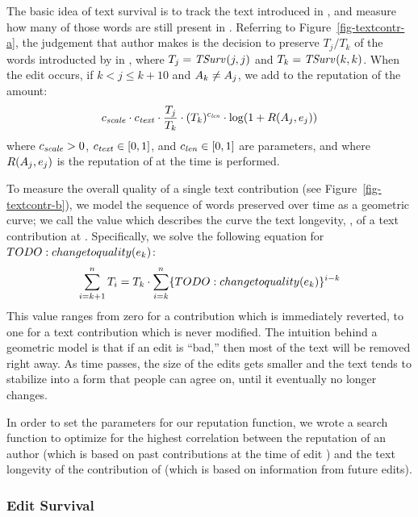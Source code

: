   The basic idea of text survival is to track the text introduced in
  , and measure how many of those words are
  still present in .
  Referring to Figure~\ref{fig-textcontr-a}, the judgement
  that author  makes is the
  decision to preserve $T_j / T_k$ of the words introducted
  by  in , where
  $T_j = \mathit{TSurv}_{}(j,j)$ and $T_k = \mathit{TSurv}_{}(k,k)$.
  When the edit  occurs, if
  $k < j \leq k+10$ and $A_{k} \neq A_{j}$,
  we add to the reputation
  of  the amount:
  \[
    {c_{{\text{\textit{scale}}}}} \cdot {c_{{\text{\textit{text}}}}} \cdot \frac{T_j}{T_k}
    \cdot (T_k)^{c_{{\text{\textit{len}}}}} \cdot \log(1 + R(A_{j},e_{j}))
  \]
  where ${c_{{\text{\textit{scale}}}}} > 0$, ${c_{{\text{\textit{text}}}}} \in [0,1]$, and ${c_{{\text{\textit{len}}}}} \in
  [0,1]$ are parameters, and where $R(A_{j},e_{j})$
  is the reputation of  at the time  is performed.

  To measure the overall quality of a single text contribution
  (see Figure~\ref{fig-textcontr-b}), we model the sequence of
  words preserved over time as a geometric curve; we call the
  value which describes the curve
  the text longevity, \tlong, of a text contribution at .
  Specifically, we solve the following equation for $TODO: change to quality(e_{k})$:
  \begin{equation*}
  	\sum_{i=k+1}^n T_i = T_k \cdot
		\sum_{i=k}^n \{ TODO: change to quality(e_{k}) \}^{i-k}
  \end{equation*}
  This value ranges from zero for a contribution which is immediately
  reverted, to one for a text contribution which is never modified.
  The intuition behind a geometric model is that if an edit is
  ``bad,'' then most of the text will be removed right away.
  As time passes, the size of the edits gets smaller and
  the text tends to stabilize into a form
  that people can agree on, until it eventually no longer changes.

  In order to set the parameters for our reputation function,
  we wrote a search function to optimize for the highest
  correlation between the reputation of an author (which is
  based on past contributions at the time of edit )
  and the text longevity of the contribution of 
  (which is based on information from future edits).

\subsubsection*{Edit Survival}


